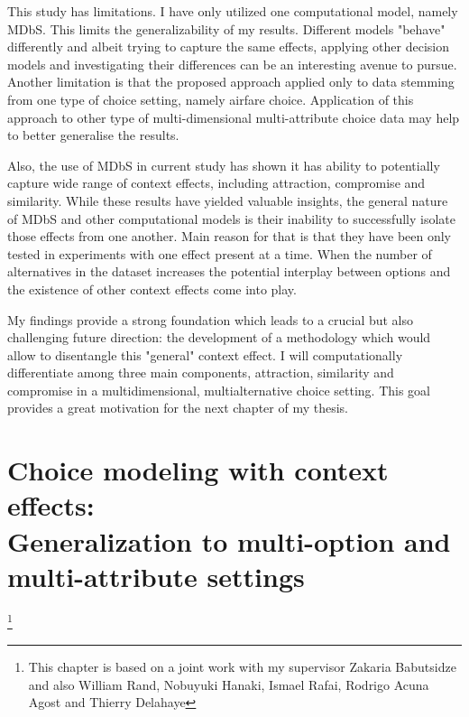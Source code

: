 \documentclass[a4paper,12pt]{article}
\begin{document}
This study has limitations. I have only utilized one computational model, namely MDbS. This limits the generalizability of my results. Different models "behave" differently and albeit trying to capture the same effects, applying other decision models and investigating their differences can be an interesting avenue to pursue. Another limitation is that the proposed approach applied only to data stemming from one type of choice setting, namely airfare choice. Application of this approach to other type of multi-dimensional multi-attribute choice data may help to better generalise the results.

Also, the use of MDbS in current study has shown it has ability to potentially capture wide range of context effects, including attraction, compromise and similarity. While these results have yielded valuable insights, the general nature of MDbS and other computational models is their inability to successfully isolate those effects from one another. Main reason for that is that they have been only tested in experiments with one effect present at a time. When the number of alternatives in the dataset increases the potential interplay between options and the existence of other context effects come into play. 

My findings provide a strong foundation which leads to a crucial but also challenging future direction: the development of a methodology which would allow to disentangle this "general" context effect. I will computationally differentiate among three main components, attraction, similarity and compromise in a multidimensional, multialternative choice setting. This goal provides a great motivation for the next chapter of my thesis.

\newpage

\section{Choice modeling with context effects:\\
Generalization to multi-option and multi-attribute settings
}  \footnote{This chapter is based on a joint work with my supervisor Zakaria Babutsidze and also William Rand, Nobuyuki Hanaki, Ismael Rafai, Rodrigo Acuna Agost and Thierry Delahaye}
\end{document}
